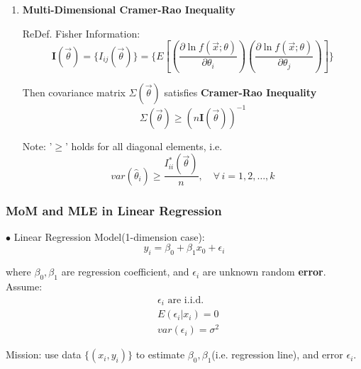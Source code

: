 \documentclass[11pt,a4paper]{ctexart}
\numberwithin{equation}{section}%
\begin{document}
\begin{enumerate}
\item \textbf{Multi-Dimensional Cramer-Rao Inequality}

    ReDef. Fisher Information:
    \[
        \mathbf{I}(\vec{\theta})=\{I_{ij}(\vec{\theta})\}=\{E\left[\left(\frac{\partial\ln f(\vec{x};\theta)}{\partial\theta_i}\right)\left(\frac{\partial\ln f(\vec{x};\theta)}{\partial\theta_j}\right)\right]\}  
    \]

    Then covariance matrix $\Sigma(\vec{\theta})$ satisfies \textbf{Cramer-Rao Inequality}
    \[
        \Sigma(\vec{\theta})\geq (n\mathbf{I}(\vec{\theta}))^{-1}
    \]

    Note: '$\geq$' holds for all diagonal elements, i.e.
\[
    var(\hat{\theta}_i)\geq \frac{I^*_{ii}(\vec{\theta})}{n},\quad \forall\,i=1,2,\ldots,k  
\]


    
\end{enumerate}

\subsubsection{MoM and MLE in Linear Regression}\label{SubSectionMoM_MLE_LinearRegression}
    $\bullet$ Linear Regression Model(1-dimension case):
    \[
        y_i=\beta_0+\beta_1x_0+\epsilon_i    
    \]

    where $\beta_0,\beta_1$ are regression coefficient, and $\epsilon_i$ are unknown random \textbf{error}. Assume:
    \begin{align*}
        &\epsilon_i\text{ are i.i.d.}\\
        &E(\epsilon_i|x_i)=0\\
        &var(\epsilon_i)=\sigma^2
    \end{align*}

    Mission: use data $\{(x_i,y_i)\}$ to estimate $\beta_0,\beta_1$(i.e. regression line), and error $\epsilon_i$.
\end{document}
